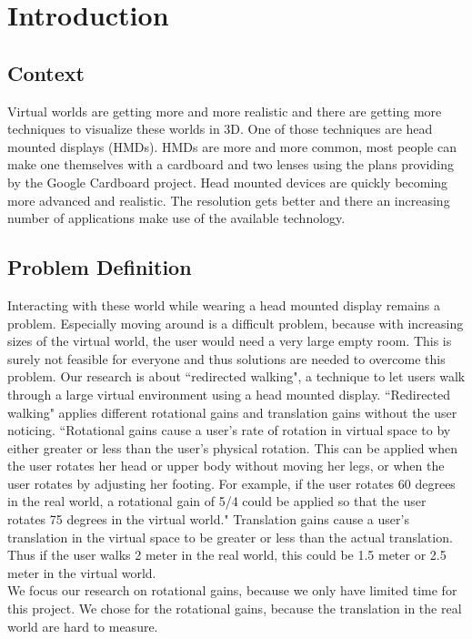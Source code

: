 \section{Introduction}
\subsection{Context}\label{sec:context}
Virtual worlds are getting more and more realistic and there are getting more techniques to visualize these worlds in 3D. 
One of those techniques are head mounted displays (HMDs).
 HMDs are more and more common, most people can make one themselves with a cardboard and two lenses using the plans providing by the Google Cardboard project. 
 Head mounted devices are quickly becoming more advanced and realistic. 
 The resolution gets better and there an increasing number of applications make use of the available technology.

\subsection{Problem Definition}\label{sec:problem}
Interacting with these world while wearing a head mounted display remains a problem. 
Especially moving around is a difficult problem, because with increasing sizes of the virtual world, the user would need a very large empty room. 
This is surely not feasible for everyone and thus solutions are needed to overcome this problem. 
Our research is about ``redirected walking", a technique to let users walk through a large virtual environment using a head mounted display. 
``Redirected walking" applies different rotational gains and translation gains without the user noticing. 
``Rotational gains cause a user's rate of rotation in virtual space to by either greater or less than 
the user's physical rotation. 
This can be applied when the user rotates her head or upper body without moving her legs, or when the user rotates by adjusting her footing. 
For example, if the user rotates 60 degrees in the real world, a rotational gain of 5/4 could be applied so that the user rotates 75 degrees in the virtual world."\cite{jwalker}
Translation gains cause a user's translation in the virtual space to be greater or less than the actual translation. 
Thus if the user walks 2 meter in the real world, this could be 1.5 meter or 2.5 meter in the virtual world. \\
We focus our research on rotational gains, because we only have limited time for this project. 
We chose for the rotational gains, because the translation in the real world are hard to measure.

